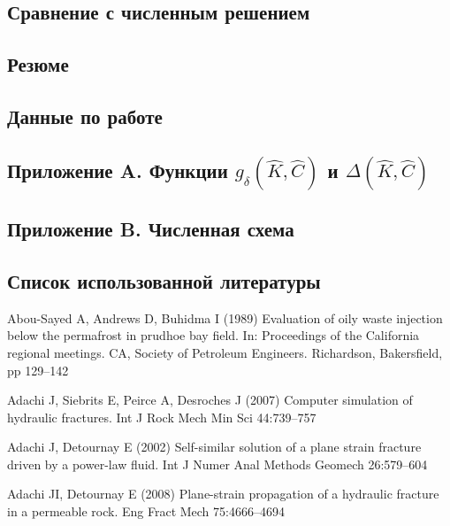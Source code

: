 \documentclass[main.tex]{subfiles}
\begin{document}
\subsection{Сравнение с численным решением}

\subsection{Резюме}

\subsection{Данные по работе}

\subsection*{Приложение A. Функции $g_{\delta}\!\left(\hat{K},\hat{C}\right)$ и $\Delta\!\left(\hat{K},\hat{C}\right)$}


\subsection*{Приложение B. Численная схема}


\subsection*{Список использованной литературы}

Abou-Sayed A, Andrews D, Buhidma I (1989) Evaluation of oily waste injection below the permafrost in prudhoe bay field. In: Proceedings of the California regional meetings. CA, Society of Petroleum Engineers. Richardson, Bakersfield, pp 129–142

Adachi J, Siebrits E, Peirce A, Desroches J (2007) Computer simulation of hydraulic fractures. Int J Rock Mech Min Sci 44:739–757

Adachi J, Detournay E (2002) Self-similar solution of a plane strain fracture driven by a power-law fluid. Int J Numer Anal Methods Geomech 26:579–604 

Adachi JI, Detournay E (2008) Plane-strain propagation of a hydraulic fracture in a permeable rock. Eng Fract Mech 75:4666–4694
\end{document}
